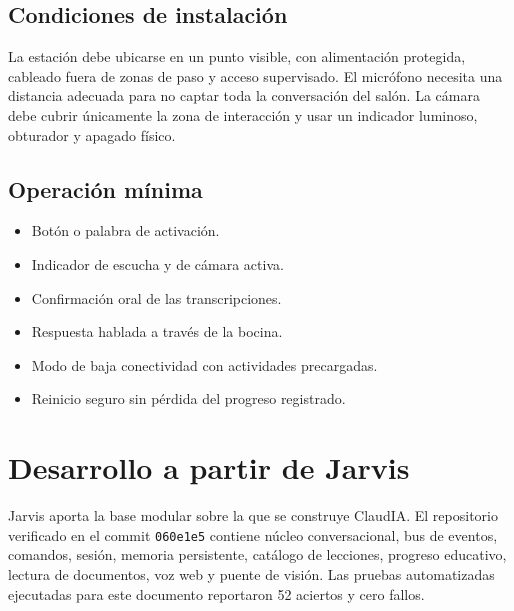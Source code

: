\documentclass[letterpaper,11pt]{article}
\begin{document}
\subsection*{Condiciones de instalación}
La estación debe ubicarse en un punto visible, con alimentación protegida, cableado fuera de zonas de paso y acceso supervisado. El micrófono necesita una distancia adecuada para no captar toda la conversación del salón. La cámara debe cubrir únicamente la zona de interacción y usar un indicador luminoso, obturador y apagado físico.

\subsection*{Operación mínima}
\begin{itemize}
  \item Botón o palabra de activación.
  \item Indicador de escucha y de cámara activa.
  \item Confirmación oral de las transcripciones.
  \item Respuesta hablada a través de la bocina.
  \item Modo de baja conectividad con actividades precargadas.
  \item Reinicio seguro sin pérdida del progreso registrado.
\end{itemize}

\clearpage

\section{Desarrollo a partir de Jarvis}

Jarvis aporta la base modular sobre la que se construye ClaudIA. El repositorio verificado en el commit \texttt{060e1e5} contiene núcleo conversacional, bus de eventos, comandos, sesión, memoria persistente, catálogo de lecciones, progreso educativo, lectura de documentos, voz web y puente de visión. Las pruebas automatizadas ejecutadas para este documento reportaron 52 aciertos y cero fallos.
\end{document}
